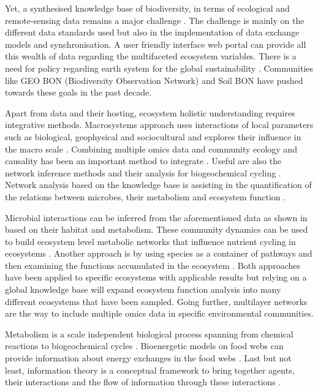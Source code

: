 Yet, a synthesised knowledge base of biodiversity, in terms of ecological and
remote-sensing data remains a major challenge \parencite{feng2022Review}. The challenge
is mainly on the different data standards used but also in the implementation of 
data exchange models and synchronisation.
A user friendly interface web portal can provide all this wealth of data
regarding the multifaceted ecosystem variables. There is a need for policy regarding earth system for the global
sustainability \parencite{reid2010earth}. Communities like GEO BON (Biodiversity Observation Network) and Soil BON
have pushed towards these goals in the past decade.

Apart from data and their hosting, ecosystem holistic understanding requires
integrative methods. Macrosystems approach uses interactions of local parameters
such as biological, geophysical and sociocultural and explores their influence in
the macro scale \parencite{heffernan2014}. Combining multiple omics data and community ecology and causality has
been an important method to integrate \parencite{jurburg2022community}. Useful are also the network inference methods 
and their analysis for biogeochemical cycling \parencite{jameson2023Network}.
Network analysis based on the knowledge base is assisting in the quantification
of the relations between microbes, their metabolism and ecosystem
function \parencite{graham2016Microbes,muller2018Using, perez_garcia2016Metabolic}.

Microbial interactions can be inferred from the aforementioned data as shown
in \parencite{machado2021Polarization} based on their habitat and metabolism.
These community dynamics can be used to build ecosystem level metabolic
networks \parencite{perez_garcia2016Metabolic} that influence nutrient cycling in
ecosystems \parencite{bauer2018Network}. Another approach is by using species as a
container of pathways and then examining the functions accumulated in the
ecosystem \parencite{loucaDecouplingFunctionTaxonomy2016}. Both approaches have
been applied to specific ecosystems with applicable results but relying on a
global knowledge base will expand ecosystem function analysis into many
different ecosystems that have been sampled.
Going further, multilayer networks \parencite{marine-multilayers}
are the way to include multiple omics data in specific environmental communities. 

Metabolism is a scale independent biological process spanning from chemical reactions
to biogeochemical cycles \parencite{hall2018understanding}. Bioenergetic models on food 
webs can provide information about energy exchanges in the food webs \parencite{valdovinos2023bioenergetic}.
Last but not least, information theory is a conceptual framework to bring together agents,
their interactions and the flow of information through these interactions \parencite{oconnor-information-ecology}.

